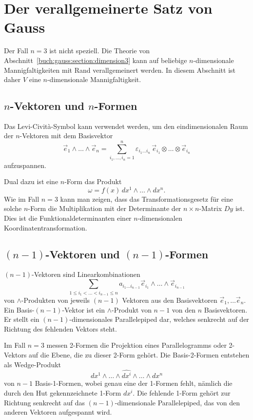 %
%
\section{Der verallgemeinerte Satz von Gauss
\label{buch:gauss:section:satzvongauss}}
Der Fall $n=3$ ist nicht speziell.
Die Theorie von Abschnitt~\ref{buch:gauss:section:dimension3}
kann auf beliebige $n$-dimensionale Mannigfaltigkeiten mit Rand
verallgemeinert werden.
In diesem Abschnitt ist daher $V$ eine $n$-dimensionale Mannigfaltigkeit.

% 
%
\subsection{$n$-Vektoren und $n$-Formen}
Das Levi-Cività-Symbol kann verwendet werden, um den eindimensionalen
Raum der $n$-Vektoren mit dem Basisvektor
\[
\vec{e}_1\wedge\dots\wedge \vec{e}_n
=
\sum_{i_1,\dots,i_n=1}^n
\varepsilon_{i_1\dots i_n}
\,
\vec{e}_{i_1}\otimes\dots\otimes\vec{e}_{i_n}
\]
aufzuspannen.

Dual dazu ist eine $n$-Form das Produkt
\[
\omega
=
f(x)
\,
dx^1\wedge\dots\wedge dx^n.
\]
Wie im Fall $n=3$ kann man zeigen, dass das Transformationsgesetz
für eine solche $n$-Form die Multiplikation mit der Determinante
der $n\times n$-Matrix $Dy$ ist.
Dies ist die Funktionaldeterminanten einer $n$-dimensionalen
Koordinatentransformation.

%
%
\subsection{$(n-1)$-Vektoren und $(n-1)$-Formen}
$(n-1)$-Vektoren sind Linearkombinationen
\[
\sum_{1\le i_1<\dots<i_{n-1}\le n}
a_{i_1\dots i_{n-1}}
\vec{e}_{i_1}\wedge\dots\wedge \vec{e}_{i_{n-1}}
\]
von $\wedge$-Produkten von jeweils $(n-1)$ Vektoren aus den Basisvektoren
$\vec{e}_1,\dots\vec{e}_n$.
Ein Basis-$(n-1)$-Vektor ist ein $\wedge$-Produkt von $n-1$ von den $n$
Basisvektoren.
Er stellt ein $(n-1)$-dimensionales Parallelepiped dar, welches senkrecht
auf der Richtung des fehlenden Vektors steht.

Im Fall $n=3$ messen 2-Formen die Projektion eines Parallelogramms
oder 2-Vektors auf die Ebene, die zu dieser 2-Form gehört.
Die Basis-2-Formen entstehen als Wedge-Produkt
\[
dx^1\wedge\dots\wedge \widehat{dx^i}\wedge\dots\wedge dx^n
\]
von $n-1$ Basis-1-Formen, wobei genau eine der 1-Formen fehlt,
nämlich die durch den Hut gekennzeichnete 1-Form $dx^i$.
Die fehlende 1-Form gehört zur Richtung senkrecht auf das
$(n-1)$-dimensionale Parallelepiped, das von den anderen Vektoren
aufgespannt wird.

